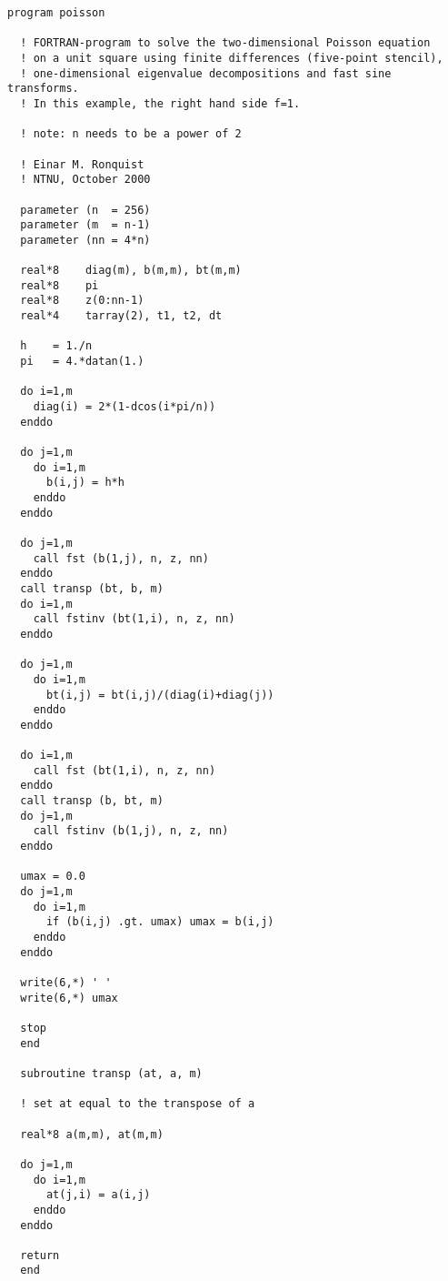 \begin{lstlisting}[style=fortran]
  program poisson

  ! FORTRAN-program to solve the two-dimensional Poisson equation
  ! on a unit square using finite differences (five-point stencil),
  ! one-dimensional eigenvalue decompositions and fast sine transforms.
  ! In this example, the right hand side f=1.

  ! note: n needs to be a power of 2

  ! Einar M. Ronquist
  ! NTNU, October 2000

  parameter (n  = 256)
  parameter (m  = n-1)
  parameter (nn = 4*n)

  real*8    diag(m), b(m,m), bt(m,m)
  real*8    pi
  real*8    z(0:nn-1)
  real*4    tarray(2), t1, t2, dt

  h    = 1./n
  pi   = 4.*datan(1.)

  do i=1,m
    diag(i) = 2*(1-dcos(i*pi/n))
  enddo

  do j=1,m
    do i=1,m
      b(i,j) = h*h
    enddo
  enddo

  do j=1,m
    call fst (b(1,j), n, z, nn)
  enddo
  call transp (bt, b, m)
  do i=1,m
    call fstinv (bt(1,i), n, z, nn)
  enddo

  do j=1,m
    do i=1,m
      bt(i,j) = bt(i,j)/(diag(i)+diag(j))
    enddo
  enddo

  do i=1,m
    call fst (bt(1,i), n, z, nn)
  enddo
  call transp (b, bt, m)
  do j=1,m
    call fstinv (b(1,j), n, z, nn)
  enddo

  umax = 0.0
  do j=1,m
    do i=1,m
      if (b(i,j) .gt. umax) umax = b(i,j)
    enddo
  enddo

  write(6,*) ' '
  write(6,*) umax

  stop
  end

  subroutine transp (at, a, m)

  ! set at equal to the transpose of a

  real*8 a(m,m), at(m,m)

  do j=1,m
    do i=1,m
      at(j,i) = a(i,j)
    enddo
  enddo

  return
  end
\end{lstlisting}
